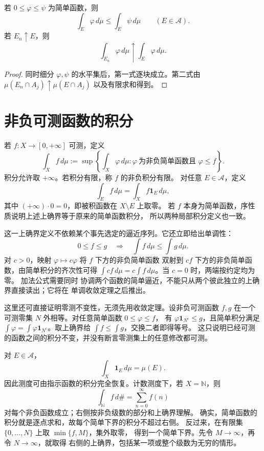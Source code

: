 \begin{proposition}[序性质]
\label{prop:simple-integral-order}
若 \(0\le\varphi\le\psi\) 为简单函数，则
\[
 \int_E\varphi\,d\mu\le\int_E\psi\,d\mu\qquad(E\in\mathcal A).
\]
若 \(E_n\uparrow E\)，则
\[
 \int_{E_n}\varphi\,d\mu\uparrow\int_E\varphi\,d\mu .
\]
\end{proposition}

\begin{proof}
同时细分 \(\varphi,\psi\) 的水平集后，第一式逐块成立。第二式由
\(\mu(E_n\cap A_j)\uparrow\mu(E\cap A_j)\) 以及有限求和得到。
\end{proof}

\section{非负可测函数的积分}

\begin{definition}
若 \(f:X\to[0,+\infty]\) 可测，定义
\[
 \int_X f\,d\mu
 :=\sup\left\{\int_X\varphi\,d\mu:
       \varphi\ \text{为非负简单函数且 }\varphi\le f\right\}.
\]
积分允许取 \(+\infty\)。若积分有限，称 \(f\) 的非负积分有限。
对任意 \(E\in\mathcal A\)，定义
\[
 \int_E f\,d\mu=\int_X f\mathbf1_E\,d\mu,
\]
其中 \((+\infty)\cdot0=0\)，即被积函数在 \(X\setminus E\) 上取零。
若 \(f\) 本身为简单函数，序性质说明上述上确界等于原来的简单函数积分，
所以两种局部积分定义也一致。
\end{definition}

这一上确界定义不依赖某个事先选定的逼近序列。它还立即给出单调性：
\[
 0\le f\le g\quad\Longrightarrow\quad
 \int f\,d\mu\le\int g\,d\mu .
\]
对 \(c>0\)，映射 \(\varphi\mapsto c\varphi\) 将 \(f\) 下方的非负简单函数
双射到 \(cf\) 下方的非负简单函数，由简单积分的齐次性可得
\(\int cf\,d\mu=c\int f\,d\mu\)。当 \(c=0\) 时，两端按约定均为零。
加法公式需要同时
协调两个函数的简单逼近，不能只从两个彼此独立的上确界直接读出；它将在
单调收敛定理之后推出。

这里还可直接证明零测不变性，无须先用收敛定理。设非负可测函数
\(f,g\) 在一个可测零集 \(N\) 外相等。对任意简单函数 \(0\le\varphi\le f\)，
有 \(\varphi\mathbf1_{N^c}\le g\)，且简单积分满足
\(\int\varphi=\int\varphi\mathbf1_{N^c}\)。取上确界给
\(\int f\le\int g\)，交换二者即得等号。
这只说明已经可测的函数之间的积分不变，并没有断言零测集上的任意修改都可测。

\begin{example}
对 \(E\in\mathcal A\)，
\[
 \int_X\mathbf1_E\,d\mu=\mu(E).
\]
因此测度可由指示函数的积分完全恢复。计数测度下，若
\(X=\mathbb N\)，则
\[
 \int_{\mathbb N} f\,d\#=\sum_{n=0}^{\infty}f(n)
\]
对每个非负函数成立；右侧按非负级数的部分和上确界理解。
确实，简单函数的积分就是逐点求和，故每个简单下界的积分不超过右侧。
反过来，在有限集 \(\{0,\ldots,N\}\) 上取 \(\min\{f,M\}\)，集外取零，
得到一个简单下界。先令 \(M\to\infty\)，再令 \(N\to\infty\)，就取得
右侧的上确界，包括某一项或整个级数为无穷的情形。
\end{example}

